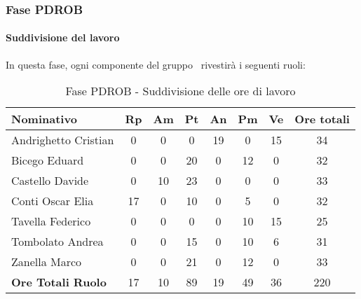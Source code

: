\documentclass[../PianoProgetto.tex]{subfiles}
\begin{document}
	\subsubsection{Fase PDROB}
				\paragraph{Suddivisione del lavoro}
					In questa fase, ogni componente del gruppo \leaf\ rivestirà i seguenti ruoli:
	
	\begin{table}[h]
	
		\begin{tabularx}{\textwidth}{l  * {6}{C}  c}
			\toprule
			\textbf{Nominativo} & \textbf{Rp} & \textbf{Am} & \textbf{Pt} 
						& \textbf{An} & \textbf{Pm} & \textbf{Ve} & \textbf{Ore totali} \\
			\midrule
			Andrighetto Cristian & 0 &	0 &	0 &	19 & 0 & 15 & 34 \\
			Bicego Eduard & 0 &	0 &	20 & 0 & 12 & 0 & 32 \\
			Castello Davide & 0 & 10 & 23 &	0 &	0 &	0 &	33 \\
			Conti Oscar Elia & 17 &	0 &	10 & 0 & 5 & 0 & 32 \\
			Tavella Federico &	0 &	0 &	0 &	0 &	10 & 15 & 25 \\
			Tombolato Andrea & 0 & 0 &	15 & 0 & 10 & 6 & 31 \\
			Zanella Marco & 0 & 0 &	21 & 0 & 12 & 0 & 33 \\
			\midrule			
			\textbf{Ore Totali Ruolo} & 17 & 10 & 89 & 19 & 49 &	36 & 220 \\
			\bottomrule
		\end{tabularx}
		
		\caption{Fase PDROB - Suddivisione delle ore di lavoro}
		\label{tab:fasePDROB_ore}
		
	\end{table}
	
\end{document}
